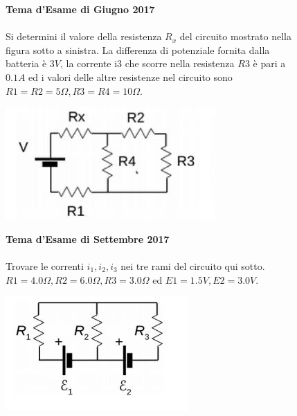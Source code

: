 \begin{figure}[h!]
\textbf{Tema d'Esame di Giugno 2017}\\ \\
 Si determini il valore della resistenza $R_x$ del circuito mostrato nella figura sotto a sinistra. La differenza di potenziale fornita dalla batteria è $3 V$, la corrente i3 che scorre nella resistenza $R3$ è pari a $0.1 A$ ed i valori delle altre resistenze nel circuito
sono $R1 = R2 = 5 \Omega ,R3 = R4 = 10 \Omega$.
\begin{center}
		\includegraphics[scale=1.1]{ES5/GIU052017.jpg}
	\end{center}
\end{figure}

\begin{figure}[h!]
\textbf{Tema d'Esame di Settembre 2017}\\ \\
Trovare le correnti $i_1, i_2 , i_3$ nei tre rami del circuito qui sotto.
$R1 = 4.0 \Omega, R2 = 6.0 \Omega, R3 = 3.0 \Omega$ ed $ E 1 = 1.5 V,  E 2 = 3.0 V$.
\begin{center}
		\includegraphics[scale=1.1]{ES5/SET052017.jpg}
	\end{center}
\end{figure}